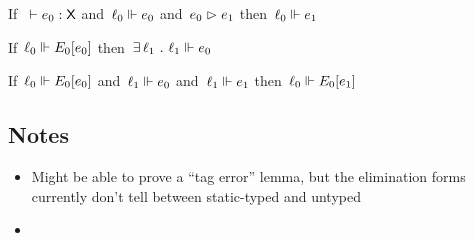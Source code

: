 \documentclass[nonacm,10pt]{acmart}
\begin{document}
\begin{lemma}
  If\ $~\vdash e_0 : \mathsf{X}$
  and\ $\ell_0 \Vdash e_0$
  and\ $e_0 \vartriangleright e_1$
  then\ $\ell_0 \Vdash e_1$
\end{lemma}

\begin{lemma}
  If\ $\ell_0 \Vdash E_0[e_0]$
  then\ $\exists\,\ell_1~.~ \ell_1 \Vdash e_0$
\end{lemma}

\begin{lemma}
  If\ $\ell_0 \Vdash E_0[e_0]$
  and\ $\ell_1 \Vdash e_0$
  and\ $\ell_1 \Vdash e_1$
  then\ $\ell_0 \Vdash E_0[e_1]$
\end{lemma}


\subsection{Notes}

\begin{itemize}
  \item
    Might be able to prove a ``tag error'' lemma, but the elimination forms
     currently don't tell between static-typed and untyped
  \item
    \ 
\end{itemize}
\end{document}
